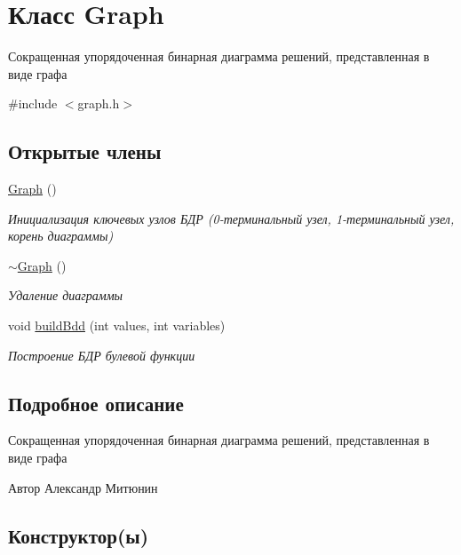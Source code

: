 \hypertarget{class_graph}{}\section{Класс Graph}
\label{class_graph}


Сокращенная упорядоченная бинарная диаграмма решений, представленная в виде графа  




{\ttfamily \#include $<$graph.\+h$>$}

\subsection*{Открытые члены}
\begin{DoxyCompactItemize}
\item 
\hyperlink{class_graph_ae4c72b8ac4d693c49800a4c7e273654f}{Graph} ()
\begin{DoxyCompactList}\small\item\em Инициализация ключевых узлов БДР (0-\/терминальный узел, 1-\/терминальный узел, корень диаграммы) \end{DoxyCompactList}\item 
\hyperlink{class_graph_a902c5b3eacb66d60752525ab23297a95}{$\sim$\+Graph} ()
\begin{DoxyCompactList}\small\item\em Удаление диаграммы \end{DoxyCompactList}\item 
void \hyperlink{class_graph_a675ba6677488ad224ff32d0fde0644c5}{build\+Bdd} (int values, int variables)
\begin{DoxyCompactList}\small\item\em Построение БДР булевой функции \end{DoxyCompactList}\end{DoxyCompactItemize}


\subsection{Подробное описание}
Сокращенная упорядоченная бинарная диаграмма решений, представленная в виде графа 

\begin{DoxyAuthor}{Автор}
Александр Митюнин 
\end{DoxyAuthor}


\subsection{Конструктор(ы)}
